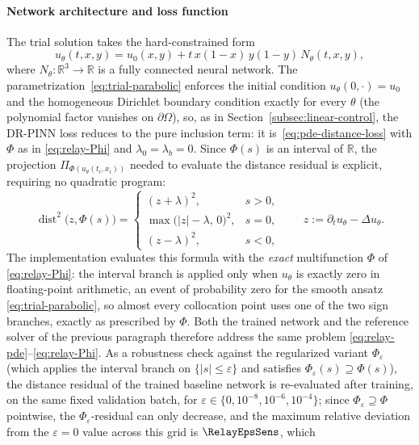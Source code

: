 \documentclass[11pt]{elsarticle}
\theoremstyle{definition}
\theoremstyle{remark}
\numberwithin{equation}{section}
\def\dist{\operatorname{dist}}
\begin{document}
\paragraph{Network architecture and loss function}
The trial solution takes the hard-constrained form
\begin{equation}
	\label{eq:trial-parabolic}
	u_\theta(t,x,y)
	= u_0(x,y) + t\,x(1-x)\,y(1-y)\,N_\theta(t,x,y),
\end{equation}
where $N_\theta:\mathbb{R}^3\to\mathbb{R}$ is a fully connected neural
network. The parametrization~\eqref{eq:trial-parabolic} enforces the
initial condition $u_\theta(0,\cdot)=u_0$ and the homogeneous Dirichlet
boundary condition exactly for every $\theta$ (the polynomial factor
vanishes on $\partial\Omega$), so, as in
Section~\ref{subsec:linear-control}, the DR-PINN loss reduces to the pure
inclusion term: it is~\eqref{eq:pde-distance-loss} with
$\Phi$ as in \eqref{eq:relay-Phi} and $\lambda_0=\lambda_b=0$. Since $\Phi(s)$ is an interval of
$\mathbb{R}$, the projection $\Pi_{\Phi(u_\theta(t_i,x_i))}$ needed to
evaluate the distance residual is explicit, requiring no quadratic program:
\[
\dist^2\!\bigl(z,\Phi(s)\bigr)
=
\begin{cases}
(z+\lambda)^2, & s>0,\\[2pt]
\max\bigl(|z|-\lambda,\,0\bigr)^2, & s=0,\\[2pt]
(z-\lambda)^2, & s<0,
\end{cases}
\qquad
z:=\partial_t u_\theta-\Delta u_\theta.
\]
The implementation evaluates this formula with the \emph{exact}
multifunction $\Phi$ of \eqref{eq:relay-Phi}: the interval branch is
applied only when $u_\theta$ is exactly zero in floating-point
arithmetic, an event of probability zero for the smooth ansatz
\eqref{eq:trial-parabolic}, so almost every collocation point uses one of
the two sign branches, exactly as prescribed by $\Phi$. Both the trained
network and the reference solver of the previous paragraph therefore
address the same problem \eqref{eq:relay-pde}--\eqref{eq:relay-Phi}. As a
robustness check against the regularized variant
$\Phi_\varepsilon$ (which applies the interval branch on
$\{|s|\le\varepsilon\}$ and satisfies
$\Phi_\varepsilon(s)\supseteq\Phi(s)$), the distance residual of the
trained baseline network is re-evaluated after training, on the same
fixed validation batch, for
$\varepsilon\in\{0,10^{-8},10^{-6},10^{-4}\}$; since
$\Phi_\varepsilon\supseteq\Phi$ pointwise, the $\Phi_\varepsilon$-residual
can only decrease, and the maximum relative deviation from the
$\varepsilon=0$ value across this grid is $\RelayEpsSens$, which
\end{document}
